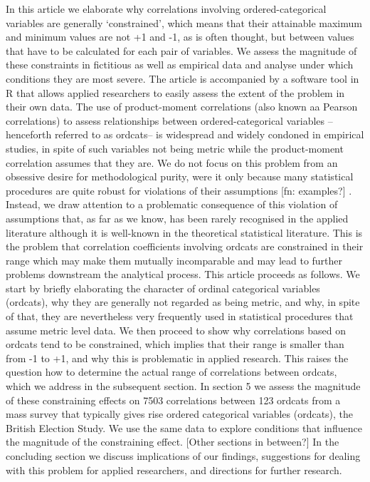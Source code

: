 \documentclass[
  12pt,
]{article}
\begin{document}
In this article we elaborate why correlations involving
ordered-categorical variables are generally `constrained', which means
that their attainable maximum and minimum values are not +1 and -1, as
is often thought, but between values that have to be calculated for each
pair of variables. We assess the magnitude of these constraints in
fictitious as well as empirical data and analyse under which conditions
they are most severe. The article is accompanied by a software tool in R
that allows applied researchers to easily assess the extent of the
problem in their own data. The use of product-moment correlations (also
known aa Pearson correlations) to assess relationships between
ordered-categorical variables --henceforth referred to as ordcats-- is
widespread and widely condoned in empirical studies, in spite of such
variables not being metric while the product-moment correlation assumes
that they are. We do not focus on this problem from an obsessive desire
for methodological purity, were it only because many statistical
procedures are quite robust for violations of their assumptions {[}fn:
examples?{]} . Instead, we draw attention to a problematic consequence
of this violation of assumptions that, as far as we know, has been
rarely recognised in the applied literature although it is well-known in
the theoretical statistical literature. This is the problem that
correlation coefficients involving ordcats are constrained in their
range which may make them mutually incomparable and may lead to further
problems downstream the analytical process. This article proceeds as
follows. We start by briefly elaborating the character of ordinal
categorical variables (ordcats), why they are generally not regarded as
being metric, and why, in spite of that, they are nevertheless very
frequently used in statistical procedures that assume metric level data.
We then proceed to show why correlations based on ordcats tend to be
constrained, which implies that their range is smaller than from -1 to
+1, and why this is problematic in applied research. This raises the
question how to determine the actual range of correlations between
ordcats, which we address in the subsequent section. In section 5 we
assess the magnitude of these constraining effects on 7503 correlations
between 123 ordcats from a mass survey that typically gives rise ordered
categorical variables (ordcats), the British Election Study. We use the
same data to explore conditions that influence the magnitude of the
constraining effect. {[}Other sections in between?{]} In the concluding
section we discuss implications of our findings, suggestions for dealing
with this problem for applied researchers, and directions for further
research.
\end{document}
